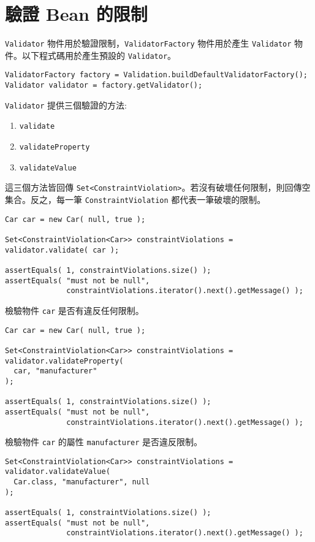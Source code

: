 \section{驗證 Bean 的限制}

\texttt{Validator} 物件用於驗證限制，\texttt{ValidatorFactory} 物件用於產生 \texttt{Validator} 物件。以下程式碼用於產生預設的 \texttt{Validator}。

\begin{lstlisting}
ValidatorFactory factory = Validation.buildDefaultValidatorFactory();
Validator validator = factory.getValidator();
\end{lstlisting}

\texttt{Validator} 提供三個驗證的方法:

\begin{enumerate}
\item \texttt{validate}
\item \texttt{validateProperty}
\item \texttt{validateValue}
\end{enumerate}

這三個方法皆回傳 \texttt{Set<ConstraintViolation>}。若沒有破壞任何限制，則回傳空集合。反之，每一筆 \texttt{ConstraintViolation} 都代表一筆破壞的限制。

\begin{lstlisting}
Car car = new Car( null, true );

Set<ConstraintViolation<Car>> constraintViolations = validator.validate( car );

assertEquals( 1, constraintViolations.size() );
assertEquals( "must not be null",
              constraintViolations.iterator().next().getMessage() );
\end{lstlisting}

檢驗物件 \texttt{car} 是否有違反任何限制。

\begin{lstlisting}
Car car = new Car( null, true );

Set<ConstraintViolation<Car>> constraintViolations = validator.validateProperty(
  car, "manufacturer"
);

assertEquals( 1, constraintViolations.size() );
assertEquals( "must not be null",
              constraintViolations.iterator().next().getMessage() );
\end{lstlisting}

檢驗物件 \texttt{car} 的屬性 \texttt{manufacturer} 是否違反限制。

\begin{lstlisting}
Set<ConstraintViolation<Car>> constraintViolations = validator.validateValue(
  Car.class, "manufacturer", null
);

assertEquals( 1, constraintViolations.size() );
assertEquals( "must not be null",
              constraintViolations.iterator().next().getMessage() );
\end{lstlisting}

